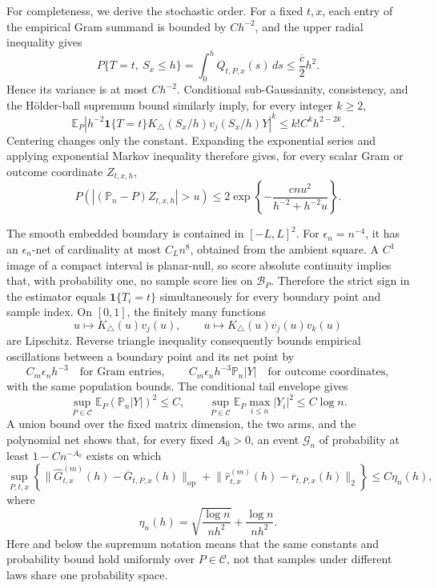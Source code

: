 For completeness, we derive the stochastic order.  For a fixed \(t,x\), each entry of the empirical Gram summand is bounded by \(Ch^{-2}\), and the upper radial inequality gives
\[
 P\{T=t,\ S_x\leq h\}=\int_0^hQ_{t,P,x}(s)\,ds
 \leq\frac{\overline c}{2}h^2.
\]
Hence its variance is at most \(Ch^{-2}\).  Conditional sub-Gaussianity, consistency, and the H\"older-ball supremum bound similarly imply, for every integer \(k\geq2\),
\[
 \mathbb E_P\left|
 h^{-2}\mathbf1\{T=t\}K_\triangle(S_x/h)v_j(S_x/h)Y
 \right|^k
 \leq k!C^kh^{2-2k}.
\]
Centering changes only the constant.  Expanding the exponential series and applying exponential Markov inequality therefore gives, for every scalar Gram or outcome coordinate \(Z_{t,x,h}\),
\[
 P\!\left(\left|(\mathbb P_n-P)Z_{t,x,h}\right|>u\right)
 \leq2\exp\!\left\{-\frac{cnu^2}{h^{-2}+h^{-2}u}\right\}.
\]

The smooth embedded boundary is contained in \([-L,L]^2\).  For \(\epsilon_n=n^{-4}\), it has an \(\epsilon_n\)-net of cardinality at most \(C_Ln^8\), obtained from the ambient square.  A \(C^1\) image of a compact interval is planar-null, so score absolute continuity implies that, with probability one, no sample score lies on \(\mathcal B_P\).  Therefore the strict sign in the estimator equals \(\mathbf1\{T_i=t\}\) simultaneously for every boundary point and sample index.  On \([0,1]\), the finitely many functions
\[
 u\longmapsto K_\triangle(u)v_j(u),
 \qquad
 u\longmapsto K_\triangle(u)v_j(u)v_k(u)
\]
are Lipschitz.  Reverse triangle inequality consequently bounds empirical oscillations between a boundary point and its net point by
\[
 C_m\epsilon_nh^{-3}
 \quad\text{for Gram entries},
 \qquad
 C_m\epsilon_nh^{-3}\mathbb P_n|Y|
 \quad\text{for outcome coordinates},
\]
with the same population bounds.  The conditional tail envelope gives
\[
 \sup_{P\in\mathcal C}\mathbb E_P(\mathbb P_n|Y|)^2\leq C,
 \qquad
 \sup_{P\in\mathcal C}\mathbb E_P\max_{i\leq n}|Y_i|^2\leq C\log n.
\]
A union bound over the fixed matrix dimension, the two arms, and the polynomial net shows that, for every fixed \(A_0>0\), an event \(\mathcal G_n\) of probability at least \(1-Cn^{-A_0}\) exists on which
\[
 \sup_{P,t,x}\left\{
 \lVert\widehat G^{(m)}_{t,x}(h)-\overline G_{t,P,x}(h)\rVert_{\mathrm{op}}
 +\lVert\widehat r^{(m)}_{t,x}(h)-\overline r_{t,P,x}(h)\rVert_2
 \right\}
 \leq C\eta_n(h),
\]
where
\[
 \eta_n(h)=\sqrt{\frac{\log n}{nh^2}}+\frac{\log n}{nh^2}.
\]
Here and below the supremum notation means that the same constants and probability bound hold uniformly over \(P\in\mathcal C\), not that samples under different laws share one probability space.

